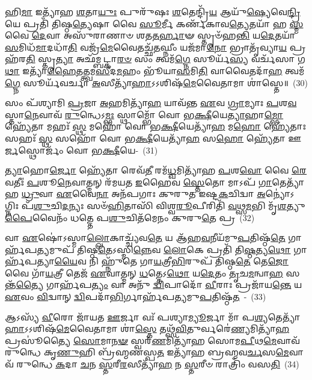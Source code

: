 𑌹𑌿\-\ul{𑌮𑌾} 𑌇𑌤𑍍𑌯𑌾᳴𑌹 \ul{𑌶}\-𑌤𑌾\-\ul{𑌯𑍁𑌃} 𑌪𑍁𑌰𑍁᳴𑌷𑌃 \ul{𑌶}\-𑌤𑍇𑌨𑍍𑌦𑍍𑌰𑌿᳴\-\ul{𑌯} 𑌆𑌯𑍁᳴\-\ul{𑌷𑍍𑌯𑍇}\-𑌵𑍇\-\ul{𑌨𑍍𑌦𑍍𑌰𑌿}\-𑌯𑍇 𑌪𑍍𑌰𑌤𑌿᳴ 𑌤𑌿𑌷𑍍𑌠\-\ul{𑌤𑍍𑌯𑍇}\-𑌷𑌾 𑌵𑍈 \ul{𑌸𑍂}\-𑌰𑍍𑌮𑍀 𑌕𑌰𑍍𑌣᳴𑌕𑌾𑌵\-\ul{𑌤𑍍𑌯𑍇}\-𑌤𑌯𑌾᳴ 𑌹 \ul{𑌸𑍍𑌮} 𑌵𑍈 \ul{𑌦𑍇}\-𑌵𑌾 𑌅𑌸𑍁᳴𑌰𑌾𑌣𑌾𑍞 𑌶𑌤\-\ul{𑌤}\-\-\ul{𑌰𑍍}\-\mbox{}𑌹𑌾𑍟 𑌸𑍍𑌤𑍃𑍞᳴𑌹\-\ul{𑌨𑍍𑌤𑌿} 𑌯\-\ul{𑌦𑍇}\-𑌤𑌯𑌾᳴ \ul{𑌸}\-𑌮𑌿𑌧᳴\-\ul{𑌮𑌾}\-𑌦𑌧𑌾᳴\-\ul{𑌤𑌿} 𑌵𑌜𑍍𑌰᳴\-\ul{𑌮𑍇}\-𑌵𑍈𑌤𑌚𑍍𑌛᳴\-\ul{𑌤}\-𑌘𑍍𑌨𑍀𑌂 𑌯𑌜᳴𑌮𑌾\-\ul{𑌨𑍋} 𑌭𑍍𑌰𑌾𑌤𑍃᳴𑌵𑍍𑌯𑌾\-\ul{𑌯} 𑌪𑍍𑌰𑌹᳴𑌰\-\ul{𑌤𑌿} 𑌸𑍍𑌤𑍃\-\ul{𑌤𑍍𑌯𑌾} 𑌅𑌛᳴𑌮𑍍𑌬𑌟𑍍𑌕𑌾\-\ul{𑌰}\-\-\ul{𑍞} 𑌸𑌂 𑌤𑍍𑌵𑌮᳴\-\ul{𑌗𑍍𑌨𑍇} 𑌸𑍂𑌰𑍍𑌯᳴\-\ul{𑌸𑍍𑌯} 𑌵𑌰𑍍𑌚᳴𑌸𑌾 𑌗\-\ul{𑌥𑌾} 𑌇𑌤𑍍𑌯𑌾᳴\-\ul{𑌹𑍈}\-𑌤𑌤𑍍𑌤𑍍𑌵𑌮\-\ul{𑌸𑍀}\-𑌦\-\ul{𑌮}\-𑌹𑌂 𑌭𑍂᳴𑌯𑌾\-\ul{𑌸}\-𑌮𑌿\-\ul{𑌤𑌿} 𑌵𑌾𑌵𑍈𑌤𑌦𑌾᳴\-\ul{𑌹} 𑌤𑍍𑌵𑌮᳴\-\ul{𑌗𑍍𑌨𑍇} 𑌸𑍂𑌰𑍍𑌯᳴𑌵𑌰𑍍𑌚𑌾 \ul{𑌅}\-𑌸𑍀𑌤𑍍𑌯𑌾᳴\-\ul{𑌹𑌾}\-\-𑌽\-𑌽𑌶𑌿𑌷᳴\-\ul{𑌮𑍇}\-𑌵𑍈𑌤𑌾𑌮𑌾 𑌶𑌾॑𑌸𑍍𑌤𑍇॥~(30)

{\anuvakamend[{\-\ul{𑌮𑍂}\-𑌰𑍍𑌧𑌾\-\ul{𑌨𑌂} 𑌵𑍈 𑌤𑌿𑌷𑍍𑌠᳴𑌤 𑌆𑌹 \ul{𑌶}\-𑌤\-\ul{𑌮}\-𑌹𑍞 𑌷𑍋𑌡᳴𑌶 𑌚}]}%

𑌸𑌂 𑌪᳴𑌶𑍍𑌯𑌾𑌮𑌿 \ul{𑌪𑍍𑌰}\-𑌜𑌾 \ul{𑌅}\-𑌹𑌮𑌿𑌤𑍍𑌯𑌾᳴\-\ul{𑌹} 𑌯𑌾𑌵᳴𑌨𑍍𑌤 \ul{𑌏}\-𑌵 \ul{𑌗𑍍𑌰𑌾}\-𑌮𑍍𑌯𑌾𑌃 \ul{𑌪}\-𑌶\-\ul{𑌵}\-𑌸𑍍𑌤𑌾\-\ul{𑌨𑍇}\-𑌵𑌾𑌵᳴ \ul{𑌰𑍁}\-𑌨𑍍𑌧𑍇\-𑌽\-\ul{𑌮𑍍𑌭𑌃} 𑌸𑍍𑌥𑌾𑌮𑍍𑌭𑍋᳴ 𑌵𑍋 𑌭\-\ul{𑌕𑍍𑌷𑍀}\-𑌯𑍇\-\ul{𑌤𑍍𑌯𑌾}\-𑌹𑌾\-\ul{𑌮𑍍𑌭𑍋} 𑌹𑍍𑌯𑍇᳴𑌤𑌾 𑌮𑌹𑌃᳴ \ul{𑌸𑍍𑌥} 𑌮𑌹𑍋᳴ 𑌵𑍋 𑌭\-\ul{𑌕𑍍𑌷𑍀}\-𑌯𑍇𑌤𑍍𑌯𑌾᳴\-\ul{𑌹} 𑌮\-\ul{𑌹𑍋} 𑌹𑍍𑌯𑍇᳴𑌤𑌾𑌃 𑌸𑌹𑌃᳴ \ul{𑌸𑍍𑌥} 𑌸𑌹𑍋᳴ 𑌵𑍋 𑌭\-\ul{𑌕𑍍𑌷𑍀}\-𑌯𑍇𑌤𑍍𑌯𑌾᳴\-\ul{𑌹} 𑌸\-\ul{𑌹𑍋} 𑌹𑍍𑌯𑍇᳴𑌤𑌾 𑌊\-\ul{𑌰𑍍𑌜}\-𑌸𑍍𑌥𑍋𑌰𑍍𑌜𑌂᳴ 𑌵𑍋 𑌭\-\ul{𑌕𑍍𑌷𑍀}\-𑌯𑍇-~(31)

\-\ul{𑌤𑍍𑌯𑌾}\-𑌹𑍋\-\ul{𑌰𑍍𑌜𑍋} 𑌹𑍍𑌯𑍇᳴𑌤𑌾 𑌰𑍇𑌵᳴\-\ul{𑌤𑍀} 𑌰𑌮᳴\-\ul{𑌧𑍍𑌵}\-𑌮𑌿𑌤𑍍𑌯𑌾᳴𑌹 \ul{𑌪}\-𑌶\-\ul{𑌵𑍋} 𑌵𑍈 \ul{𑌰𑍇}\-𑌵𑌤𑍀𑌃॑ \ul{𑌪}\-𑌶𑍂\-\ul{𑌨𑍇}\-𑌵𑌾𑌤𑍍𑌮𑌨𑍍 𑌰᳴𑌮𑌯𑌤 \ul{𑌇}\-𑌹𑍈𑌵 \ul{𑌸𑍍𑌤𑍇}\-𑌤𑍋 𑌮𑌾\-𑌽𑌪᳴ \ul{𑌗𑌾}\-𑌤𑍇𑌤𑍍𑌯𑌾᳴𑌹 \ul{𑌧𑍍𑌰𑍁}\-𑌵𑌾 \ul{𑌏}\-𑌵𑍈\-\ul{𑌨𑌾} 𑌅𑌨᳴𑌪𑌗𑌾𑌃 𑌕𑍁𑌰𑍁𑌤 𑌇𑌷𑍍𑌟\-\ul{𑌕}\-𑌚𑌿𑌦𑍍𑌵𑌾 \ul{𑌅}\-𑌨𑍍𑌯𑍋॑\-𑌽𑌗𑍍𑌨𑌿𑌃 𑌪᳴\-\ul{𑌶𑍁}\-𑌚𑌿\-\ul{𑌦}\-𑌨𑍍𑌯𑌃 𑌸𑍞᳴\-\ul{𑌹𑌿}\-𑌤𑌾𑌸𑌿᳴ 𑌵𑌿𑌶𑍍𑌵\-\ul{𑌰𑍂}\-𑌪𑍀𑌰𑌿𑌤𑌿᳴ \ul{𑌵}\-𑌥𑍍𑌸\-\ul{𑌮}\-𑌭𑌿 𑌮𑍃᳴\-\ul{𑌶}\-𑌤𑍍𑌯𑍁\-\ul{𑌪𑍈}\-𑌵𑍈𑌨𑌂᳴ 𑌧𑌤𑍍𑌤𑍇 𑌪\-\ul{𑌶𑍁}\-𑌚𑌿𑌤᳴𑌮𑍇𑌨𑌂 𑌕𑍁𑌰𑍁\-\ul{𑌤𑍇} 𑌪𑍍𑌰~(32)

𑌵𑌾 \ul{𑌏}\-𑌷𑍋॑\-𑌽𑌸𑍍𑌮𑌾\-\ul{𑌲𑍍𑌲𑍋}\-𑌕𑌾𑌚𑍍𑌚𑍍𑌯᳴𑌵\-\ul{𑌤𑍇} 𑌯 𑌆᳴𑌹\-\ul{𑌵}\-𑌨𑍀𑌯᳴𑌮𑍁\-\ul{𑌪}\-𑌤𑌿𑌷𑍍𑌠᳴\-\ul{𑌤𑍇} 𑌗𑌾𑌰𑍍\mbox{}𑌹᳴𑌪\-\ul{𑌤𑍍𑌯}\-𑌮𑍁𑌪᳴ 𑌤𑌿𑌷𑍍𑌠\-\ul{𑌤𑍇}\-\-𑌽𑌸𑍍𑌮𑌿\-\ul{𑌨𑍍𑌨𑍇}\-𑌵 \ul{𑌲𑍋}\-𑌕𑍇 𑌪𑍍𑌰𑌤𑌿᳴ 𑌤𑌿\-\ul{𑌷𑍍𑌠}\-𑌤𑍍𑌯\-\ul{𑌥𑍋} 𑌗𑌾𑌰𑍍\mbox{}𑌹᳴𑌪𑌤𑍍𑌯𑌾\-\ul{𑌯𑍈}\-𑌵 𑌨𑌿 𑌹𑍍𑌨𑍁᳴𑌤𑍇 𑌗𑌾\-\ul{𑌯}\-𑌤𑍍𑌰𑍀\-\ul{𑌭𑌿}\-𑌰𑍁𑌪᳴ 𑌤𑌿𑌷𑍍𑌠\-\ul{𑌤𑍇} 𑌤𑍇\-\ul{𑌜𑍋} 𑌵𑍈 𑌗𑌾᳴\-\ul{𑌯}\-𑌤𑍍𑌰𑍀 𑌤𑍇𑌜᳴ \ul{𑌏}\-𑌵𑌾𑌤𑍍𑌮𑌨𑍍 \ul{𑌧}\-𑌤𑍍𑌤𑍇\-𑌽\-\ul{𑌥𑍋} 𑌯\-\ul{𑌦𑍇}\-𑌤𑌂 \ul{𑌤𑍃}\-𑌚\-\ul{𑌮}\-𑌨𑍍𑌵𑌾\-\ul{𑌹} 𑌸𑌨𑍍𑌤᳴\-\ul{𑌤𑍍𑌯𑍈} 𑌗𑌾𑌰𑍍\mbox{}𑌹᳴𑌪\-\ul{𑌤𑍍𑌯𑌂} 𑌵𑌾 𑌅𑌨𑍁᳴ \ul{𑌦𑍍𑌵𑌿}\-𑌪𑌾𑌦𑍋᳴ \ul{𑌵𑍀}\-𑌰𑌾𑌃 𑌪𑍍𑌰𑌜𑌾᳴𑌯\-\ul{𑌨𑍍𑌤𑍇} 𑌯 \ul{𑌏}\-𑌵𑌂 \ul{𑌵𑌿}\-𑌦𑍍𑌵𑌾𑌨𑍍 \ul{𑌦𑍍𑌵𑌿}\-𑌪𑌦𑌾᳴\-\ul{𑌭𑌿}\-𑌰𑍍𑌗𑌾𑌰𑍍\mbox{}𑌹᳴𑌪𑌤𑍍𑌯𑌮𑍁\-\ul{𑌪}\-𑌤𑌿𑌷𑍍𑌠᳴\-\ul{𑌤}\-~-~(33)

𑌆\-𑌽𑌸𑍍𑌯᳴ \ul{𑌵𑍀}\-𑌰𑍋 𑌜𑌾᳴𑌯𑌤 \ul{𑌊}\-𑌰𑍍𑌜𑌾 𑌵𑌃᳴ 𑌪𑌶𑍍𑌯𑌾\-\ul{𑌮𑍍𑌯𑍂}\-𑌰𑍍𑌜𑌾 𑌮𑌾᳴ 𑌪\-\ul{𑌶𑍍𑌯}\-𑌤𑍇𑌤𑍍𑌯𑌾᳴\-\ul{𑌹𑌾}\-\-𑌽\-𑌽𑌶𑌿𑌷᳴\-\ul{𑌮𑍇}\-𑌵𑍈𑌤𑌾𑌮𑌾 𑌶𑌾॑\-\ul{𑌸𑍍𑌤𑍇} 𑌤𑌥𑍍𑌸᳴\-\ul{𑌵𑌿}\-𑌤𑍁𑌰𑍍𑌵𑌰𑍇॑\-\ul{𑌣𑍍𑌯}\-𑌮𑌿𑌤𑍍𑌯𑌾᳴\-\ul{𑌹} 𑌪𑍍𑌰𑌸𑍂॑𑌤𑍍𑌯𑍈 \ul{𑌸𑍋}\-𑌮𑌾\-\ul{𑌨}\-\-\ul{𑍟} 𑌸𑍍𑌵𑌰᳴\-\ul{𑌣}\-𑌮𑌿𑌤𑍍𑌯𑌾᳴𑌹 𑌸𑍋𑌮\-\ul{𑌪𑍀}\-𑌥\-\ul{𑌮𑍇}\-𑌵𑌾𑌵᳴ 𑌰𑍁𑌨𑍍𑌧𑍇 𑌕𑍃\-\ul{𑌣𑍁}\-𑌹𑌿 𑌬𑍍𑌰᳴𑌹𑍍𑌮𑌣𑌸𑍍𑌪\-\ul{𑌤} 𑌇𑌤𑍍𑌯𑌾᳴𑌹 𑌬𑍍𑌰𑌹𑍍𑌮𑌵\-\ul{𑌰𑍍𑌚}\-𑌸\-\ul{𑌮𑍇}\-𑌵𑌾𑌵᳴ 𑌰𑍁𑌨𑍍𑌧𑍇 \ul{𑌕}\-𑌦𑌾 \ul{𑌚}\-𑌨 \ul{𑌸𑍍𑌤}\-𑌰𑍀\-\ul{𑌰}\-𑌸𑍀𑌤𑍍𑌯𑌾᳴\-\ul{𑌹} 𑌨 \ul{𑌸𑍍𑌤}\-𑌰𑍀𑍞 𑌰𑌾𑌤𑍍𑌰𑌿𑌂᳴ 𑌵𑌸\-\ul{𑌤𑌿}\-~(34)

